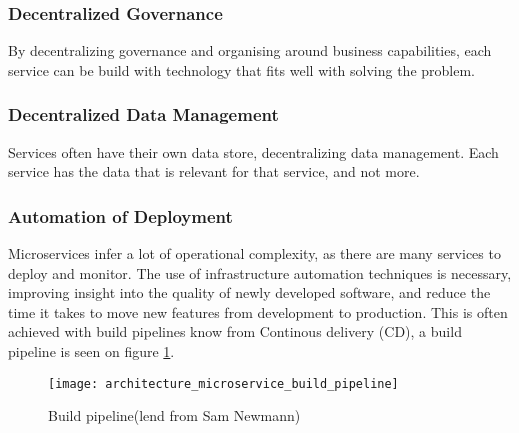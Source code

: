 \subsubsection*{Decentralized Governance}
By decentralizing governance and organising around business capabilities, each service can be build with technology that fits well with solving the problem.

\subsubsection*{Decentralized Data Management}
Services often have their own data store, decentralizing data management. Each service has the data that is relevant for that service, and not more. 


\subsubsection*{Automation of Deployment}
Microservices infer a lot of operational complexity, as there are many services to deploy and monitor. The use of infrastructure automation techniques is necessary, improving insight into the quality of newly developed software, and reduce the time it takes to move new features from development to production\cite{newman2015microservices}. This is often achieved with build pipelines know from Continous delivery (CD), a build pipeline is seen on figure \ref{fig:architecture_microservice_build_pipeline}.

\begin{figure}[!htb]
  \texttt{[image: architecture\_microservice\_build\_pipeline]}  
  \caption{Build pipeline(lend from Sam Newmann)}
  \label{fig:architecture_microservice_build_pipeline}
\end{figure}


